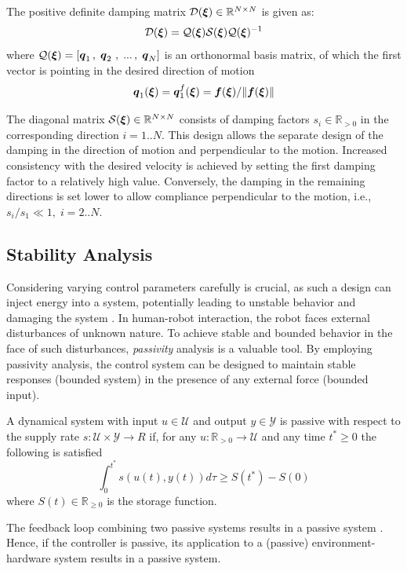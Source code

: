 The positive definite damping matrix $\mathcal{D}(\boldsymbol{\xi}) \in \mathbb{R}^{N \times N}$ is given as:
\begin{equation}
   \matd {D}(\vecs \xi) = \matd{Q}(\vecs\xi)\matd{S}(\vecs\xi) \matd{Q} (\vecs \xi)^{-1}
\label{eq:damping_matrix}
\end{equation}
where $\mathcal{Q}(\boldsymbol{\xi}) = \left[ \boldsymbol{q}_1 \, , \; \boldsymbol{q}_2\ , \; ... \, , \; \boldsymbol{q}_N \right] $ is an orthonormal basis matrix, of which the first vector is pointing in the desired direction of motion
\begin{equation}
    \vecs q_1(\vecs \xi) = \vecs q_1^f(\vecs \xi) = \vect f({\vecs \xi}) / \lVert \vect f({\vecs \xi}) \rVert \label{eq:velocity_unit_vector}
\end{equation}

The diagonal matrix $\mathcal{S}(\boldsymbol{\xi}) \in \mathbb{R}^{N \times N}$ consists of damping factors $s_i \in \mathbb{R}_{>0}$ in the corresponding direction $i = 1 .. N$.
This design allows the separate design of the damping in the direction of motion and perpendicular to the motion.
Increased consistency with the desired velocity is achieved by setting the first damping factor to a relatively high value. Conversely, the damping in the remaining directions is set lower to allow compliance perpendicular to the motion, i.e., $s_i / s_1 \ll 1, \; i = 2 .. N$.

\iflong
\subsection{Stability Analysis} \label{sec:trad_passive}
Considering varying control parameters carefully is crucial, as such a design can inject energy into a system, potentially leading to unstable behavior and damaging the system \cite{ferraguti2013tank}.
In human-robot interaction, the robot faces external disturbances of unknown nature. To achieve stable and bounded behavior in the face of such disturbances, \textit{passivity} analysis is a valuable tool. By employing passivity analysis, the control system can be designed to maintain stable responses (bounded system) in the presence of any external force (bounded input). 

\begin{definition} \label{def:passivity}
	A dynamical system with input $ u \in \mathcal{U}$ and output $y \in \mathcal{Y}$ is passive with respect to the supply rate $s : \mathcal{U} \times \mathcal{Y} \rightarrow{R}$ if, for any $u: \mathbb{R}_{>0} \rightarrow \mathcal{U}$ and any time $t^* \geq 0$ the following is satisfied
  \begin{equation}
	  \int_0^{t^*} s \left( u(t),  y (t) \right) d \tau \geq S(t^*) - S(0) 
  \end{equation}
  where $S(t) \in \mathbb{R}_{\geq 0}$ is the storage function.
\end{definition}

The feedback loop combining two passive systems results in a passive system \cite{sepulchre2012constructive}. Hence, if the controller is passive, its application to a (passive) environment-hardware system results in a passive system.
\fi

